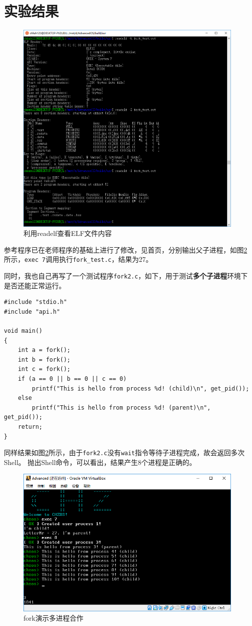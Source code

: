 \documentclass[logo,reportComp]{thesis}
\begin{document}
\section{实验结果}
\begin{figure}[H]
\centering
\includegraphics[width=0.8\linewidth]{fig/readelf.PNG}
\caption{利用readelf查看ELF文件内容}
\label{fig:readelf}
\end{figure}

参考程序已在老师程序的基础上进行了修改，见首页，分别输出父子进程，如图\ref{fig:fork}所示，\verb'exec 7'调用执行\verb'fork_test.c'，结果为27。

同时，我也自己再写了一个测试程序\verb'fork2.c'，如下，用于测试\textbf{多个子进程}环境下是否还能正常运行。
\begin{lstlisting}
#include "stdio.h"
#include "api.h"

void main()
{
	int a = fork();
	int b = fork();
	int c = fork();
	if (a == 0 || b == 0 || c == 0)
		printf("This is hello from process %d! (child)\n", get_pid());
	else
		printf("This is hello from process %d! (parent)\n", get_pid());
	return;
}
\end{lstlisting}

同样结果如图\ref{fig:fork}所示，由于\verb'fork2.c'没有\verb'wait'指令等待子进程完成，故会返回多次Shell。
抛出Shell命令，可以看出，结果产生8个进程是正确的。
\begin{figure}[H]
\centering
\includegraphics[width=0.8\linewidth]{fig/fork.PNG}
\caption{fork演示多进程合作}
\label{fig:fork}
\end{figure}
\end{document}
